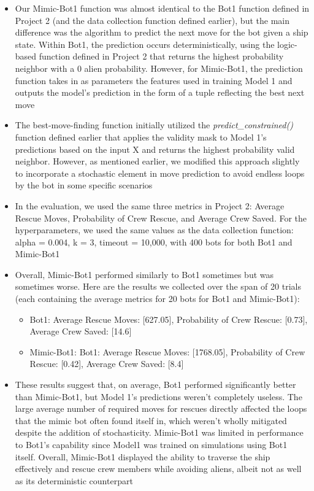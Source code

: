 \documentclass[11pt]{article}
\begin{document}
\begin{itemize}
    \item Our Mimic-Bot1 function was almost identical to the Bot1 function defined in Project 2 (and the data collection function defined earlier), but the main difference was the algorithm to predict the next move for the bot given a ship state. Within Bot1, the prediction occurs deterministically, using the logic-based function defined in Project 2 that returns the highest probability neighbor with a 0 alien probability. However, for Mimic-Bot1, the prediction function takes in as parameters the features used in training Model 1 and outputs the model's prediction in the form of a tuple reflecting the best next move
    \item The best-move-finding function initially utilized the \emph{predict\_constrained()} function defined earlier that applies the validity mask to Model 1's predictions based on the input X and returns the highest probability valid neighbor. However, as mentioned earlier, we modified this approach slightly to incorporate a stochastic element in move prediction to avoid endless loops by the bot in some specific scenarios
    \item In the evaluation, we used the same three metrics in Project 2: Average Rescue Moves, Probability of Crew Rescue, and Average Crew Saved. For the hyperparameters, we used the same values as the data collection function: alpha = 0.004, k = 3, timeout = 10,000, with 400 bots for both Bot1 and Mimic-Bot1
    \item Overall, Mimic-Bot1 performed similarly to Bot1 sometimes but was sometimes worse. Here are the results we collected over the span of 20 trials (each containing the average metrics for 20 bots for Bot1 and Mimic-Bot1):
    \begin{itemize}
        \item Bot1: {Average Rescue Moves: [627.05]}, {Probability of Crew Rescue: [0.73]}, {Average Crew Saved: [14.6]}
        \item Mimic-Bot1: Bot1: {Average Rescue Moves: [1768.05]}, {Probability of Crew Rescue: [0.42]}, {Average Crew Saved: [8.4]}
    \end{itemize}
    \item These results suggest that, on average, Bot1 performed significantly better than Mimic-Bot1, but Model 1's predictions weren't completely useless. The large average number of required moves for rescues directly affected the loops that the mimic bot often found itself in, which weren't wholly mitigated despite the addition of stochasticity. Mimic-Bot1 was limited in performance to Bot1's capability since Model1 was trained on simulations using Bot1 itself. Overall, Mimic-Bot1 displayed the ability to traverse the ship effectively and rescue crew members while avoiding aliens, albeit not as well as its deterministic counterpart

\end{itemize}
\end{document}

